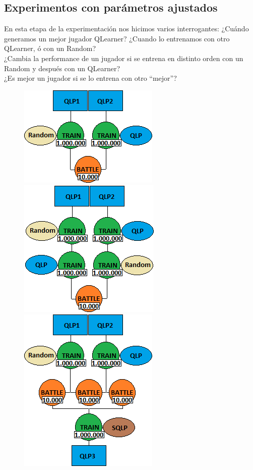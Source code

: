 \documentclass[10pt, a4paper]{article}
\begin{document}
\subsection{Experimentos con parámetros ajustados}

En esta etapa de la experimentación nos hicimos varios interrogantes:
¿Cuándo generamos un mejor jugador QLearner? 
¿Cuando lo entrenamos con otro QLearner, ó con un Random? \\
¿Cambia la performance de un jugador si se entrena en distinto orden con un Random y después con un QLearner?\\
¿Es mejor un jugador si se lo entrena con otro ``mejor''?

\begin{figure}[H]
  \begin{minipage}[c]{1\textwidth}
  \includegraphics[scale=0.5]{E1.png}
  \includegraphics[scale=0.5]{E2.png}
  \includegraphics[scale=0.5]{E3.png}

\end{minipage}
\end{figure}
\end{document}
